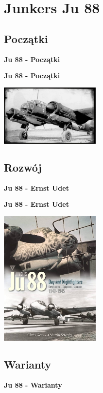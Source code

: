 \section{\textbf{Junkers Ju 88}}

\subsection{Początki}

\begin{frame}{\textbf{Ju 88 - Początki}}

\end{frame}

\begin{frame}{\textbf{Ju 88 - Początki}}
	\begin{center}
	\includegraphics[width=5cm]{images/ju88-01.jpg}
	\end{center}
\end{frame}


\subsection{Rozwój}

\begin{frame}{\textbf{Ju 88 - Ernst Udet}}

\end{frame}

\begin{frame}{\textbf{Ju 88 - Ernst Udet}}
	\begin{center}
	\includegraphics[width=5cm]{images/ju88-02.jpg}
	\end{center}
\end{frame}


\subsection{Warianty}

\begin{frame}{\textbf{Ju 88 - Warianty}}

\end{frame}






